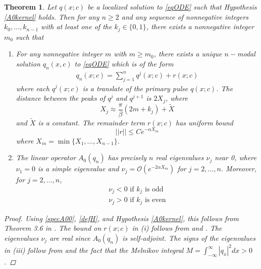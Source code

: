 \documentclass[12pt]{article}
\newtheorem{theorem}{Theorem}
\begin{document}
\begin{theorem}\label{multiexist}
Let $q(x; c)$ be a localized solution to \eqref{eqODE} such that Hypothesis \ref{A0kernel} holds. Then for any $n \geq 2$ and any sequence of nonnegative integers $k_0, \dots, k_{n-1}$ with at least one of the $k_j \in \{0, 1 \}$, there exists a nonnegative integer $m_0$ such that
\begin{enumerate}
	\item For any nonnegative integer $m$ with $m \geq m_0$, there exists a unique $n-$modal solution $q_n(x, c)$ to \eqref{eqODE} which is of the form
	\begin{align}\label{qn}
	q_n(x; c) = \sum_{j = 1}^{n} q^j(x; c) + r(x; c)
	\end{align}
	where each $q^j(x; c)$ is a translate of the primary pulse $q(x; c)$. The distance between the peaks of $q^j$ and $q^{j+1}$ is $2 X_j$, where
	\begin{equation}
	X_j \approx \frac{\pi}{\beta}(2 m + k_j) + \tilde{X}
	\end{equation}
	and $\tilde{X}$ is a constant. The remainder term $r(x; c)$ has uniform bound
	\begin{equation}\label{rbound}
	||r|| \leq C e^{-\alpha X_m}
	\end{equation}
	where $X_m = \min\{X_1, \dots, X_{n-1}\}$.
	\item The linear operator $A_0(q_n)$ has precisely $n$ real eigenvalues $\nu_j$ near 0, where $\nu_1 = 0$ is a simple eigenvalue and $\nu_j = \mathcal{O}(e^{-2\alpha X_m})$ for $j = 2, \dots, n$. Moreover, for $j = 2, \dots, n$,
	\begin{align*}
	\nu_j < 0 \text{ if } k_j \text{ is odd} \\
	\nu_j > 0 \text{ if } k_j \text{ is even} 
	\end{align*}
\end{enumerate}

\begin{proof}
Using \eqref{specA00}, \eqref{defH}, and Hypothesis \ref{A0kernel}, this follows from Theorem 3.6 in \cite{Sandstede1997}. The bound on $r(x; c)$ in (i) follows from \cite{Sanstede1993} and \cite{Sandstede1998}. The eigenvalues $\nu_j$ are real since $A_0(q_n)$ is self-adjoint. The signs of the eigenvalues in (iii) follow from \cite{Sandstede1997} and the fact that the Melnikov integral $M = \int_{-\infty}^\infty |q_x|^2 dx > 0$.
\end{proof}
\end{theorem}
\end{document}
